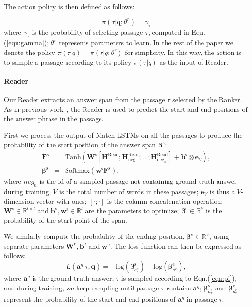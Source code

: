 \documentclass[letterpaper]{article} %
\begin{document}
The action policy is then defined as follows:

\begin{equation}
\pi (\tau | \mathbf{q}; \theta^{r}) = \gamma _\tau 
\label{eqn:pi}
\end{equation}
where $\gamma _\tau $ is the probability of selecting passage $\tau$, computed in Eqn.(\ref{eqn:gamma}); $\theta^r$ represents parameters to learn. In the rest of the paper we denote the policy $\pi(\tau|q) = \pi (\tau | q; \theta^{r})$ for simplicity. In this way, the action is to sample a passage according to its policy $\pi(\tau|q)$ as the input of Reader.

\paragraph{Reader}
Our Reader extracts an answer span from the passage $\tau$ selected by the Ranker. As in previous work~\cite{wang2016machine,xiong2016dynamic,seo2016bidirectional,wang2017gated}, the Reader is used to predict the start and end positions of the answer phrase in the passage.

First we process the output of Match-LSTMs on all the passages to produce the probability of the start position of the answer span $\mathbf{\beta}^{\text{s}}$:
\begin{eqnarray}
\nonumber
\mathbf{F}^\text{s} &=& \text{Tanh}\left( \mathbf{W}^\text{s}[\mathbf{H}^{\text{Read}}_\tau;\mathbf{H}^{\text{Read}}_{\text{neg}_1};...;\mathbf{H}^{\text{Read}}_{\text{neg}_n}] + \mathbf{b}^\text{s} \otimes \mathbf{e}_{V} \right ), \\
\mathbf{\beta}^\text{s} &=& \text{Softmax}\left( \mathbf{w}^\text{s} \mathbf{F}^\text{s} \right ),
\label{eqn:span}
\end{eqnarray}
where $neg_n$ is the id of a sampled passage not containing ground-truth answer during training;
$V$ is the total number of words in these passages; $\mathbf{e}_{V}$ is thus a $V$-dimension vector with ones; $[\cdot ; \cdot]$ is the column concatenation operation; $\mathbf{W}^\text{s}\in \mathbb{R}^{l\times l}$ and $\mathbf{b}^\text{s},\mathbf{w}^\text{s}\in \mathbb{R}^{l}$ are the parameters to optimize; $\mathbf{\beta}^\text{s}\in \mathbb{R}^{V}$ is the probability of the start point of the span.

We similarly compute the probability of the ending position, $\mathbf{\beta}^\text{e}\in \mathbb{R}^{V}$, using separate parameters $\mathbf{W}^\text{e}, \mathbf{b}^\text{e}$ and $\mathbf{w}^\text{e}$.
The loss function can then be expressed as follows:
\begin{equation}
L(\mathbf{a}^g|\tau, \mathbf{q})=-\text{log} (\mathbf{\beta}^\text{s}_{a^s_\tau}) -
\text{log} (\mathbf{\beta}^\text{e}_{a^e_\tau}) , 
\label{eqn:rc_obj}
\end{equation}
where $\mathbf{a}^g$ is the ground-truth answer; $\tau$ is sampled according to Eqn.(\ref{eqn:pi}), and during training, we keep sampling until passage $\tau$ contains $\mathbf{a}^g$; $\mathbf{\beta}^\text{s}_{a^s_\tau}$ and $\mathbf{\beta}^\text{e}_{a^e_\tau}$ represent the probability of the start and end positions of $\mathbf{a}^g$ in passage $\tau$. 
\end{document}
